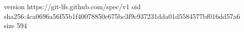 version https://git-lfs.github.com/spec/v1
oid sha256:4ca0696a56f55b1f40078850e675bc3f9c937231dda01d5584577bf016dd57a6
size 594

